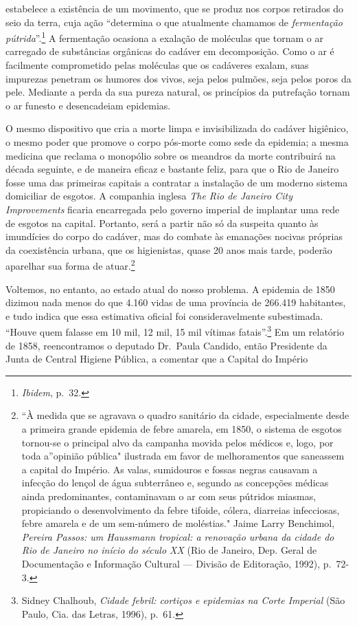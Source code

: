 estabelece a existência de um movimento, que se produz nos corpos
retirados do seio da terra, cuja ação ``determina o que atualmente
chamamos de \textit{fermentação pútrida}''.\footnote{\textit{Ibidem}, p.~32.}
A fermentação ocasiona a exalação de moléculas que tornam o ar carregado
de substâncias orgânicas do cadáver em decomposição. Como o ar é
facilmente comprometido pelas moléculas que os cadáveres exalam, suas
impurezas penetram os humores dos vivos, seja pelos pulmões, seja pelos
poros da pele. Mediante a perda da sua pureza natural, os princípios da
putrefação tornam o ar funesto e desencadeiam epidemias.

O mesmo dispositivo que cria a morte limpa e invisibilizada do cadáver
higiênico, o mesmo poder que promove o corpo pós-morte como sede da
epidemia; a mesma medicina que reclama o monopólio sobre os meandros da
morte contribuirá na década seguinte, e de maneira eficaz e bastante
feliz, para que o Rio de Janeiro fosse uma das primeiras capitais a
contratar a instalação de um moderno sistema domiciliar de esgotos. A
companhia inglesa \textit{The Rio de Janeiro City Improvements} ficaria
encarregada pelo governo imperial de implantar uma rede de esgotos na
capital. Portanto, será a partir não só da suspeita quanto às imundícies
do corpo do cadáver, mas do combate às emanações nocivas próprias da
coexistência urbana, que os higienistas, quase 20 anos mais tarde,
poderão aparelhar sua forma de atuar.\footnote{``À medida que se
  agravava o quadro sanitário da cidade, especialmente desde a primeira
  grande epidemia de febre amarela, em 1850, o sistema de esgotos
  tornou-se o principal alvo da campanha movida pelos médicos e, logo,
  por toda a''opinião pública" ilustrada em favor de melhoramentos que
  saneassem a capital do Império. As valas, sumidouros e fossas negras
  causavam a infecção do lençol de água subterrâneo e, segundo as
  concepções médicas ainda predominantes, contaminavam o ar com seus
  pútridos miasmas, propiciando o desenvolvimento da febre tifoide,
  cólera, diarreias infecciosas, febre amarela e de um sem-número de
  moléstias." Jaime Larry Benchimol, \textit{Pereira Passos: um Haussmann
  tropical: a renovação urbana da cidade do Rio de Janeiro no início do
  século XX} (Rio de Janeiro, Dep. Geral de Documentação e Informação
  Cultural --- Divisão de Editoração, 1992), p.~72-3.}

Voltemos, no entanto, ao estado atual do nosso problema. A epidemia de
1850 dizimou nada menos do que 4.160 vidas de uma província de 266.419
habitantes, e tudo indica que essa estimativa oficial foi
consideravelmente subestimada. ``Houve quem falasse em 10 mil, 12 mil,
15 mil vítimas fatais''.\footnote{Sidney Chalhoub, \textit{Cidade febril:
  cortiços e epidemias na Corte Imperial} (São Paulo, Cia. das Letras,
  1996), p.~61.} Em um relatório de 1858, reencontramos o deputado
Dr.~Paula Candido, então Presidente da Junta de Central Higiene Pública,
a comentar que a Capital do Império

